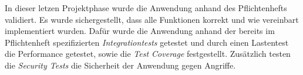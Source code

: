 
In dieser letzen Projektphase wurde die Anwendung anhand des
Pflichtenhefts validiert. Es wurde sichergestellt, dass alle Funktionen
korrekt und wie vereinbart implementiert wurden.
Dafür wurde die Anwendung anhand der bereits im Pflichtenheft
spezifizierten \emph{Integrationtests} getestet und durch einen
Lastentest die Performance getestet, sowie die
\emph{Test Coverage} festgestellt. Zusätzlich testen die
\emph{Security Tests} die Sicherheit der Anwendung gegen Angriffe.